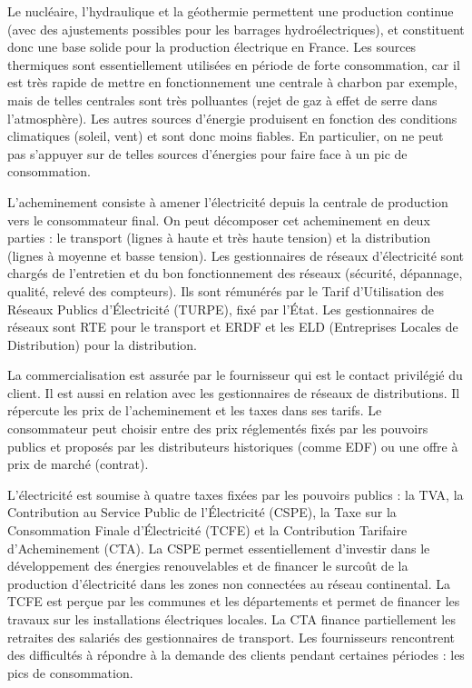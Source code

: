 \documentclass[10pt]{article}
\begin{document}
			Le nucléaire, l'hydraulique et la géothermie permettent une production continue (avec des ajustements possibles pour les barrages hydroélectriques), et constituent donc une base solide pour la production électrique en France. Les sources thermiques sont essentiellement utilisées en période de forte consommation, car il est très rapide de mettre en fonctionnement une centrale à charbon par exemple, mais de telles centrales sont très polluantes (rejet de gaz à effet de serre dans l'atmosphère). Les autres sources d'énergie produisent en fonction des conditions climatiques (soleil, vent) et sont donc moins fiables. En particulier, on ne peut pas s'appuyer sur de telles sources d'énergies pour faire face à un pic de consommation.
			
			L'acheminement consiste à amener l'électricité depuis la centrale de production vers le consommateur final. On peut décomposer cet acheminement en deux parties : le transport (lignes à haute et très haute tension) et la distribution (lignes à moyenne et basse tension). Les gestionnaires de réseaux d'électricité sont chargés de l'entretien et du bon fonctionnement des réseaux (sécurité, dépannage, qualité, relevé des compteurs). Ils sont rémunérés par le Tarif d'Utilisation des Réseaux Publics d'Électricité (TURPE), fixé par l'État. Les gestionnaires de réseaux sont RTE pour le transport et ERDF et les ELD (Entreprises Locales de Distribution) pour la distribution.
			
			La commercialisation est assurée par le fournisseur qui est le contact privilégié du client. Il est aussi en relation avec les gestionnaires de réseaux de distributions. Il répercute les prix de l'acheminement et les taxes dans ses tarifs. Le consommateur peut choisir entre des prix réglementés fixés par les pouvoirs publics et proposés par les distributeurs historiques (comme EDF) ou une offre à prix de marché (contrat).
			
			L'électricité est soumise à quatre taxes fixées par les pouvoirs publics : la TVA, la Contribution au Service Public de l'Électricité (CSPE), la Taxe sur la Consommation Finale d'Électricité (TCFE) et la Contribution Tarifaire d'Acheminement (CTA). La CSPE permet essentiellement d'investir dans le développement des énergies renouvelables et de financer le surcoût de la production d'électricité dans les zones non connectées au réseau continental. La TCFE est perçue par les communes et les départements et permet de financer les travaux sur les installations électriques locales. La CTA finance partiellement les retraites des salariés des gestionnaires de transport.
			Les fournisseurs rencontrent des difficultés à répondre à la demande des clients pendant certaines périodes : les pics de consommation.
		
\end{document}

